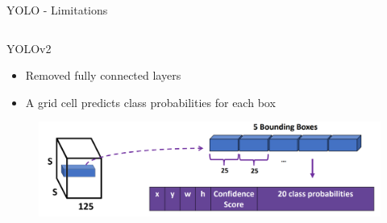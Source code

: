 \begin{frame}{YOLO - Limitations}
\begin{columns}
\begin{column}{0.5\textwidth}
        
    \end{column}
\end{columns}
\end{frame}

\begin{frame}{YOLOv2}
\begin{itemize}
    \item Removed fully connected layers
    \item A grid cell predicts class probabilities for each box
\end{itemize}
\begin{figure}
\centering
\includegraphics[width=1.0\textwidth,height=1.0\textheight,keepaspectratio]{images/obj-det/yolo_17.png}
\end{figure}

    
\end{frame}

